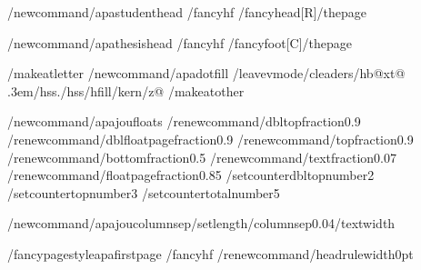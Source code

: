 /newcommand{/apastudenthead}{%
  /fancyhf{}%
  /fancyhead[R]{/thepage}}

/newcommand{/apathesishead}{%
  /fancyhf{}%
  /fancyfoot[C]{/thepage}}

/makeatletter
/newcommand{/apadotfill}{%
  /leavevmode/cleaders/hb@xt@ .3em{/hss./hss}/hfill/kern/z@}
/makeatother

%
/newcommand{/apajoufloats}{%
  /renewcommand{/dbltopfraction}{0.9}%
  /renewcommand{/dblfloatpagefraction}{0.9}%
  /renewcommand{/topfraction}{0.9}%
  /renewcommand{/bottomfraction}{0.5}%
  /renewcommand{/textfraction}{0.07}%
  /renewcommand{/floatpagefraction}{0.85}%
  /setcounter{dbltopnumber}{2}%
  /setcounter{topnumber}{3}%
  /setcounter{totalnumber}{5}}

/newcommand{/apajoucolumnsep}{/setlength{/columnsep}{0.04/textwidth}}

/fancypagestyle{apafirstpage}{%
  /fancyhf{}%
  /renewcommand{/headrulewidth}{0pt}}

